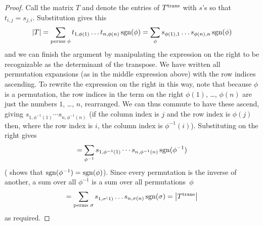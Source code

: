 \begin{proof}
Call the matrix \( T \) and denote the entries of \( {{T}^{\rm trans}} \) with
\( s \)'s so that \( t_{i,j}=s_{j,i} \).
Substitution gives this
\begin{equation*}
  \deter{T}
  =\sum_{\text{perms }\phi} t_{1,\phi(1)}\dots t_{n,\phi(n)}
          \sgn(\phi)    
  =\sum_{\phi} s_{\phi(1),1}\dots s_{\phi(n),n}
          \sgn(\phi)
\end{equation*}
and we can finish the argument by manipulating the expression on the right
to be recognizable as the determinant of the transpose.
We have written all permutation expansions 
(as in the middle expression above) 
with the row indices ascending.
To rewrite the expression on the right in this way, note that 
because $\phi$ is a permutation, 
the row indices in the term on the right $\phi(1)$, \ldots, $\phi(n)$
are just the numbers $1$, \ldots, $n$, rearranged. 
We can thus commute to have these ascend, giving
$s_{1,\phi^{-1}(1)}\cdots s_{n,\phi^{-1}(n)}$
(if the column index is $j$ and the row index is $\phi(j)$ then, 
where the row index is $i$, the column index is $\phi^{-1}(i)$). 
Substituting on the right gives
\begin{equation*}
  =\sum_{\phi^{-1}}
     s_{1,\phi^{-1}(1)}\cdots s_{n,\phi^{-1}(n)} \operatorname{sgn}(\phi^{-1})
\end{equation*}
(
shows that \( \operatorname{sgn}(\phi^{-1})=\operatorname{sgn}(\phi) \)).
Since every permutation is the inverse of another,
a sum over all $\phi^{-1}$ is a sum over all permutations~$\phi$
\begin{equation*}
  =\sum_{\text{perms }\sigma}
     s_{1,\sigma^(1)}\dots s_{n,\sigma(n)} \sgn(\sigma)  
  =\deter{\trans{T}}
\end{equation*}
as required.
\end{proof}



